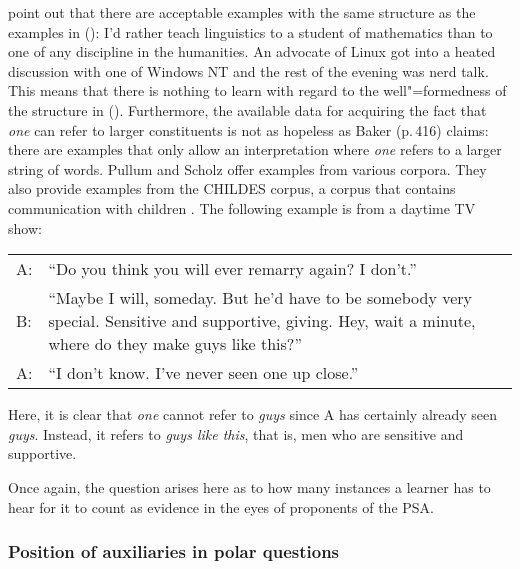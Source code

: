 \citet[]{PS2002a} point out that there are acceptable examples with the same structure as
the examples in (): 
\eal
\ex I'd rather teach linguistics to a student of mathematics than to
one of any discipline in the humanities.
\ex An advocate of Linux got into a heated discussion with one of
Windows NT and the rest of the evening was nerd talk.
\zl
\addlines
\noindent
This means that there is nothing to learn with regard to the well"=formedness of the structure in ().
Furthermore, the available data for acquiring the fact that \emph{one} can refer to larger constituents is not as hopeless
as Baker (p.\,416) claims: there are examples that only allow an interpretation where \emph{one} refers to a larger
string of words. Pullum and Scholz offer examples from various corpora. They also provide examples from the CHILDES corpus,
a corpus that contains communication with children \citep{MacWhinny95a-u}. The following example is from a daytime TV show:
\eanoraggedright
\begin{tabular}[t]{@{}l@{~}p{11cm}}
A: & ``Do you think you will ever remarry again? I don't.''\\
B: & ``Maybe I will, someday. But he'd have to be somebody very special. Sensitive and supportive, giving. Hey, wait a minute, where
   do they make guys like this?''\\
A: & ``I don't know. I've never seen one up close.''\\
\end{tabular}
\z
Here, it is clear that \emph{one}  cannot refer to \emph{guys} since A has certainly already seen \emph{guys}.
Instead, it refers to \emph{guys like this}, that is, men who are sensitive and supportive.   

Once again, the question arises here as to how many instances a learner has to hear for it to count as evidence in the eyes
of proponents of the PSA.

\subsubsection{Position of auxiliaries in polar questions}
\label{Abschnitt-Hilfsverbumstellung}

